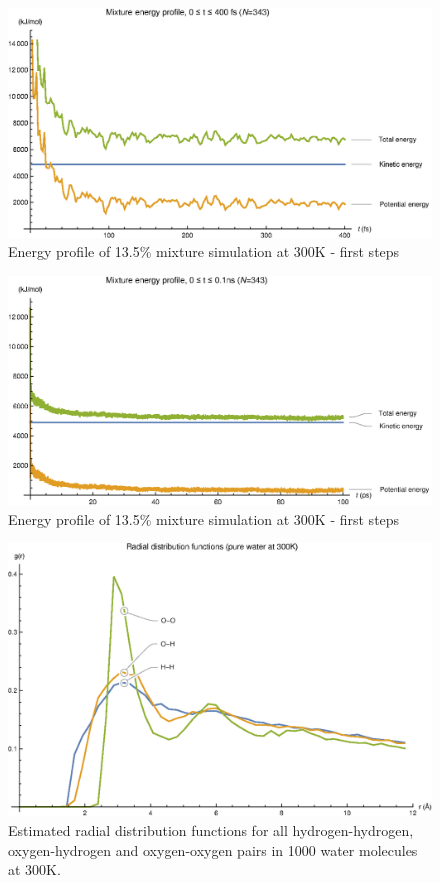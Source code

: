 \documentclass[11pt,a4paper]{article}
\begin{document}
\begin{figure}
\centering
\includegraphics[scale=0.8]{figures/emix1}
\caption{Energy profile of 13.5\% mixture simulation at 300K - first steps}\label{fig:emix1}
\end{figure}

\begin{figure}
\centering
\includegraphics[scale=0.8]{figures/emix2}
\caption{Energy profile of 13.5\% mixture simulation at 300K - first steps}\label{fig:emix2}
\end{figure}

\begin{figure}
\centering
\includegraphics[scale=0.8]{figures/rdfwater}
\caption{Estimated radial distribution functions for all hydrogen-hydrogen, oxygen-hydrogen and oxygen-oxygen pairs in 1000 water molecules at 300K.}\label{fig:rdfwater}
\end{figure}
\end{document}
